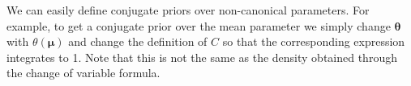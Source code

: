 \begin{remark}
    We can easily define conjugate priors over non-canonical parameters. For example, to get a conjugate prior over the mean parameter we simply change $\boldsymbol{\theta}$ with $\theta(\boldsymbol{\mu})$ and change the definition of $C$ so that the corresponding expression integrates to 1. Note that this is not the same as the density obtained through the change of variable formula.
\end{remark}
